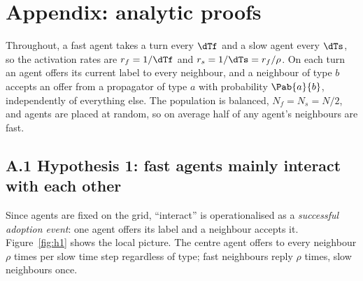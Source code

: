\section{Appendix: analytic proofs}

Throughout, a fast agent takes a turn every $\dTf$ and a slow agent every $\dTs$, so the activation rates are $r_f = 1/\dTf$ and $r_s = 1/\dTs = r_f/\rho$. On each turn an agent offers its current label to every neighbour, and a neighbour of type $b$ accepts an offer from a propagator of type $a$ with probability $\Pab{a}{b}$, independently of everything else. The population is balanced, $N_f = N_s = N/2$, and agents are placed at random, so on average half of any agent's neighbours are fast.

\subsection*{A.1 \quad Hypothesis 1: fast agents mainly interact with each other}

Since agents are fixed on the grid, ``interact'' is operationalised as a \emph{successful adoption event}: one agent offers its label and a neighbour accepts it. Figure~\ref{fig:h1} shows the local picture. The centre agent offers to every neighbour $\rho$ times per slow time step regardless of type; fast neighbours reply $\rho$ times, slow neighbours once. \\

